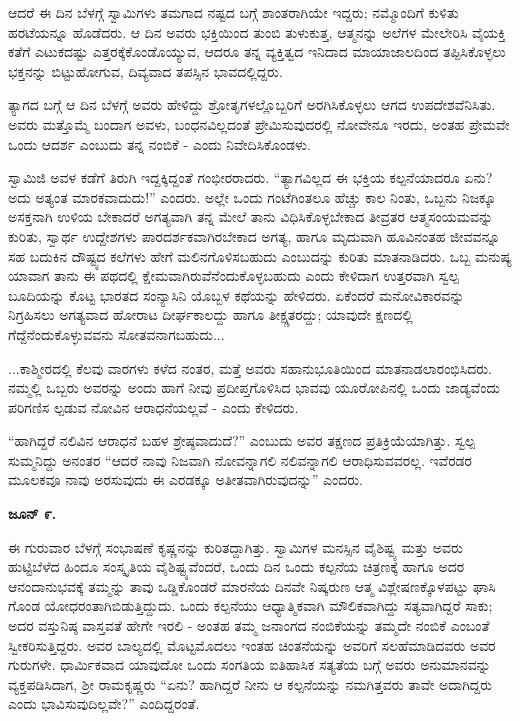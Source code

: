 ಆದರೆ ಈ ದಿನ ಬೆಳಗ್ಗೆ ಸ್ವಾಮಿಗಳು ತಮಗಾದ ನಷ್ಟದ ಬಗ್ಗೆ ಶಾಂತರಾಗಿಯೇ ಇದ್ದರು; ನಮ್ಮೊಂದಿಗೆ ಕುಳಿತು ಹರಟೆಯನ್ನೂ ಹೊಡೆದರು. ಆ ದಿನ ಅವರು ಭಕ್ತಿಯಿಂದ ತುಂಬಿ ತುಳುಕುತ್ತ, ಆತ್ಮನನ್ನು ಅಲೆಗಳ ಮೇಲೇರಿಸಿ ವೈಯಕ್ತಿ ಕತೆಗೆ ಎಟುಕದಷ್ಟು ಎತ್ತರಕ್ಕೆಕೊಂಡೊಯ್ಯುವ, ಆದರೂ ತನ್ನ ವ್ಯಕ್ತಿತ್ವದ ಇನಿದಾದ ಮಾಯಾಜಾಲದಿಂದ ತಪ್ಪಿಸಿಕೊಳ್ಳಲು ಭಕ್ತನನ್ನು ಬಿಟ್ಟುಹೋಗುವ, ದಿವ್ಯವಾದ ತಪಸ್ಸಿನ ಭಾವದಲ್ಲಿದ್ದರು.

ತ್ಯಾಗದ ಬಗ್ಗೆ ಆ ದಿನ ಬೆಳಗ್ಗೆ ಅವರು ಹೇಳಿದ್ದು ಶ್ರೋತೃಗಳಲ್ಲೊಬ್ಬರಿಗೆ ಅರಗಿಸಿಕೊಳ್ಳಲು ಆಗದ ಉಪದೇಶವೆನಿಸಿತು. ಅವರು ಮತ್ತೊಮ್ಮೆ ಬಂದಾಗ ಅವಳು, ಬಂಧನವಿಲ್ಲದಂತೆ ಪ್ರೇಮಿಸುವುದರಲ್ಲಿ ನೋವೇನೂ ಇರದು, ಅಂತಹ ಪ್ರೇಮವೇ ಒಂದು ಆದರ್ಶ ಎಂಬುದು ತನ್ನ ನಂಬಿಕೆ - ಎಂದು ನಿವೇದಿಸಿಕೊಂಡಳು.

ಸ್ವಾಮಿಜಿ ಅವಳ ಕಡೆಗೆ ತಿರುಗಿ ಇದ್ದಕ್ಕಿದ್ದಂತೆ ಗಂಭೀರರಾದರು. “ತ್ಯಾಗವಿಲ್ಲದ ಈ ಭಕ್ತಿಯ ಕಲ್ಪನೆಯಾದರೂ ಏನು? ಅದು ಅತ್ಯಂತ ಮಾರಕವಾದುದು!” ಎಂದರು. ಅಲ್ಲೇ ಒಂದು ಗಂಟೆಗಿಂತಲೂ ಹೆಚ್ಚು ಕಾಲ ನಿಂತು, ಒಬ್ಬನು ನಿಜಕ್ಕೂ ಅಸಕ್ತನಾಗಿ ಉಳಿಯ ಬೇಕಾದರೆ ಅಗತ್ಯವಾಗಿ ತನ್ನ ಮೇಲೆ ತಾನು ವಿಧಿಸಿಕೊಳ್ಳಬೇಕಾದ ತೀವ್ರತರ ಆತ್ಮಸಂಯಮವನ್ನು ಕುರಿತು, ಸ್ವಾರ್ಥ ಉದ್ದೇಶಗಳು ಪಾರದರ್ಶಕವಾಗಿರಬೇಕಾದ ಅಗತ್ಯ, ಹಾಗೂ ಮೃದುವಾಗಿ ಹೂವಿನಂತಹ ಜೀವವನ್ನೂ ಸಹ ಬದುಕಿನ ದೌಷ್ಟ್ಯದ ಕಲೆಗಳು ಹೇಗೆ ಮಲಿನಗೊಳಿಸಬಹುದು ಎಂಬುದನ್ನು ಕುರಿತು ಮಾತನಾಡಿದರು. ಒಬ್ಬ ಮನುಷ್ಯ ಯಾವಾಗ ತಾನು ಈ ಪಥದಲ್ಲಿ ಕ್ಷೇಮವಾಗಿರುವೆನೆಂದುಕೊಳ್ಳಬಹುದು ಎಂದು ಕೇಳಿದಾಗ ಉತ್ತರವಾಗಿ ಸ್ವಲ್ಪ ಬೂದಿಯನ್ನು ಕೊಟ್ಟ ಭಾರತದ ಸಂನ್ಯಾಸಿನಿ ಯೊಬ್ಬಳ ಕಥೆಯನ್ನು ಹೇಳಿದರು. ಏಕೆಂದರೆ ಮನೋವಿಕಾರವನ್ನು ನಿಗ್ರಹಿಸಲು ಅಗತ್ಯವಾದ ಹೋರಾಟ ದೀರ್ಘಕಾಲದ್ದು ಹಾಗೂ ತೀಕ್ಷ್ಣತರದ್ದು; ಯಾವುದೇ ಕ್ಷಣದಲ್ಲಿ ಗೆದ್ದೆನೆಂದುಕೊಳ್ಳುವವನು ಸೋತವನಾಗಬಹುದು...

...ಕಾಶ್ಮೀರದಲ್ಲಿ ಕೆಲವು ವಾರಗಳು ಕಳೆದ ನಂತರ, ಮತ್ತೆ ಅವರು ಸಹಾನುಭೂತಿಯಿಂದ ಮಾತನಾಡಲಾರಂಭಿಸಿದರು. ನಮ್ಮಲ್ಲಿ ಒಬ್ಬರು ಅವರನ್ನು ಅಂದು ಹಾಗೆ ನೀವು ಪ್ರದೀಪ್ತಗೊಳಿಸಿದ ಭಾವವು ಯೂರೋಪಿನಲ್ಲಿ ಒಂದು ಜಾಡ್ಯವೆಂದು ಪರಿಗಣಿಸ ಲ್ಪಡುವ ನೋವಿನ ಆರಾಧನೆಯಲ್ಲವೆ - ಎಂದು ಕೇಳಿದರು.

“ಹಾಗಿದ್ದರೆ ನಲಿವಿನ ಆರಾಧನೆ ಬಹಳ ಶ್ರೇಷ್ಠವಾದುದೆ?” ಎಂಬುದು ಅವರ ತಕ್ಷಣದ ಪ್ರತಿಕ್ರಿಯೆಯಾಗಿತ್ತು. ಸ್ವಲ್ಪ ಸುಮ್ಮನಿದ್ದು ಅನಂತರ “ಆದರೆ ನಾವು ನಿಜವಾಗಿ ನೋವನ್ನಾಗಲಿ ನಲಿವನ್ನಾಗಲಿ ಆರಾಧಿಸುವವರಲ್ಲ. ಇವೆರಡರ ಮೂಲಕವೂ ನಾವು ಅರಸುವುದು ಈ ಎರಡಕ್ಕೂ ಅತೀತವಾಗಿರುವುದನ್ನು” ಎಂದರು.

\textbf{ಜೂನ್ ೯.}

ಈ ಗುರುವಾರ ಬೆಳಗ್ಗೆ ಸಂಭಾಷಣೆ ಕೃಷ್ಣನನ್ನು ಕುರಿತದ್ದಾಗಿತ್ತು. ಸ್ವಾಮಿಗಳ ಮನಸ್ಸಿನ ವೈಶಿಷ್ಟ್ಯ ಮತ್ತು ಅವರು ಹುಟ್ಟಿಬೆಳೆದ ಹಿಂದೂ ಸಂಸ್ಕೃತಿಯ ವೈಶಿಷ್ಟ್ಯವೆಂದರೆ, ಒಂದು ದಿನ ಒಂದು ಕಲ್ಪನೆಯ ಚಿತ್ರಣಕ್ಕೆ ಹಾಗೂ ಅದರ ಆನಂದಾನುಭವಕ್ಕೆ ತಮ್ಮನ್ನು ತಾವು ಒಡ್ಡಿಕೊಂಡರೆ ಮಾರನೆಯ ದಿನವೇ ನಿಷ್ಕರುಣ ಆತ್ಮ ವಿಶ್ಲೇಷಣಕ್ಕೊಳಪಟ್ಟು ಘಾಸಿ ಗೊಂಡ ಯೋಧರಂತಾಗಿಬಿಡುತ್ತಿದ್ದುದು. ಒಂದು ಕಲ್ಪನೆಯು ಆಧ್ಯಾತ್ಮಿಕವಾಗಿ ಮೌಲಿಕವಾಗಿದ್ದು ಸತ್ಯವಾಗಿದ್ದರೆ ಸಾಕು; ಅದರ ವಸ್ತುನಿಷ್ಠ ವಾಸ್ತವತೆ ಹೇಗೇ ಇರಲಿ - ಅಂತಹ ತಮ್ಮ ಜನಾಂಗದ ನಂಬಿಕೆಯನ್ನು ತಮ್ಮದೇ ನಂಬಿಕೆ ಎಂಬಂತೆ ಸ್ವೀಕರಿಸುತ್ತಿದ್ದರು. ಅವರ ಬಾಲ್ಯದಲ್ಲಿ ಮೊಟ್ಟಮೊದಲು ಇಂತಹ ಚಿಂತನೆಯನ್ನು ಅವರಿಗೆ ಸಲಹೆಮಾಡಿದವರು ಅವರ ಗುರುಗಳೇ. ಧಾರ್ಮಿಕವಾದ ಯಾವುದೋ ಒಂದು ಸಂಗತಿಯ ಐತಿಹಾಸಿಕ ಸತ್ಯತೆಯ ಬಗ್ಗೆ ಅವರು ಅನುಮಾನವನ್ನು ವ್ಯಕ್ತಪಡಿಸಿದಾಗ, ಶ‍್ರೀ ರಾಮಕೃಷ್ಣರು “ಏನು? ಹಾಗಿದ್ದರೆ ನೀನು ಆ ಕಲ್ಪನೆಯನ್ನು ನಮಗಿತ್ತವರು ತಾವೇ ಅದಾಗಿದ್ದರು ಎಂದು ಭಾವಿಸುವುದಿಲ್ಲವೇ?” ಎಂದಿದ್ದರಂತೆ.

